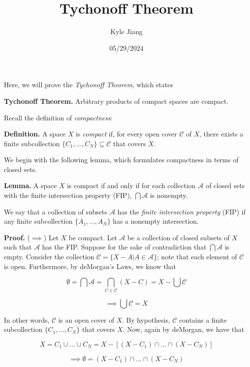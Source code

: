 \documentclass[12pt]{article}
\title{Tychonoff Theorem}
\author{Kyle Jiang}
\date{05/29/2024}
\begin{document}
\maketitle


Here, we will prove the \emph{Tychonoff Theorem}, which states

\textbf{Tychonoff Theorem. } Arbitrary products of compact spaces are compact.

\vspace{1 \baselineskip}

Recall the definition of \emph{compactness}:

\textbf{Definition. } A space $X$ is \emph{compact} if, for every open cover $\mathcal{C}$ of $X$, there exists a finite subcollection $\{ C_1, \dots, C_N \} \subseteq \mathcal{C}$ that covers $X$.

\vspace{1 \baselineskip}

We begin with the following lemma, which formulates compactness in terms of closed sets.

\textbf{Lemma. } A space $X$ is compact if and only if for each collection $\mathcal{A}$ of closed sets with the finite intersection property (FIP), $\bigcap \mathcal{A}$ is nonempty.

We say that a collection of subsets $\mathcal{A}$ has the \emph{finite intersection property} (FIP) if any finite subcollection $\{ A_1, \dots, A_N \}$ has a nonempty intersection.

\textbf{Proof. } ($\implies$) Let $X$ be compact. Let $\mathcal{A}$ be a collection of closed subsets of $X$ such that $\mathcal{A}$ has the FIP. Suppose for the sake of contradiction that $\bigcap \mathcal{A}$ is empty. Consider the collection $\mathcal{C} = \{ X - A | A \in \mathcal{A} \}$; note that each element of $\mathcal{C}$ is open. Furthermore, by deMorgan's Laws, we know that

$$\emptyset = \bigcap \mathcal{A} = \bigcap_{C \in \mathcal{C}} (X - C) = X - \bigcup \mathcal{C}$$

$$\implies \bigcup \mathcal{C} = X$$

In other words, $\mathcal{C}$ is an open cover of $X$. By hypothesis, $\mathcal{C}$ contains a finite subcollection $\{ C_1, \dots, C_N \}$ that covers $X$. Now, again by deMorgan, we have that

$$X = C_1 \cup \dots \cup C_N = X - [(X - C_1) \cap \dots \cap (X - C_N)]$$

$$\implies \emptyset = (X - C_1) \cap \dots \cap (X - C_N)$$
\end{document}
